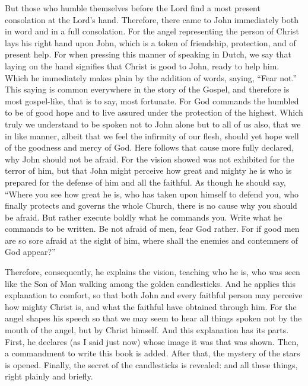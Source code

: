 But those who humble themselves before the Lord find a most present consolation at the Lord’s hand. Therefore, there came to John immediately both in word and in a full consolation. For the angel representing the person of Christ lays his right hand upon John, which is a token of friendship, protection, and of present help. For when pressing this manner of speaking in Dutch, we say that laying on the hand signifies that Christ is good to John, ready to help him. Which he immediately makes plain by the addition of words, saying, “Fear not.” This saying is common everywhere in the story of the Gospel, and therefore is most gospel-like, that is to say, most fortunate. For God commands the humbled to be of good hope and to live assured under the protection of the highest. Which truly we understand to be spoken not to John alone but to all of us also, that we in like manner, albeit that we feel the infirmity of our flesh, should yet hope well of the goodness and mercy of God. Here follows that cause more fully declared, why John should not be afraid. For the vision showed was not exhibited for the terror of him, but that John might perceive how great and mighty he is who is prepared for the defense of him and all the faithful. As though he should say, “Where you see how great he is, who has taken upon himself to defend you, who finally protects and governs the whole Church, there is no cause why you should be afraid. But rather execute boldly what he commands you. Write what he commands to be written. Be not afraid of men, fear God rather. For if good men are so sore afraid at the sight of him, where shall the enemies and contemners of God appear?”

Therefore, consequently, he explains the vision, teaching who he is, who was seen like the Son of Man walking among the golden candlesticks. And he applies this explanation to comfort, so that both John and every faithful person may perceive how mighty Christ is, and what the faithful have obtained through him. For the angel shapes his speech so that we may seem to hear all things spoken not by the mouth of the angel, but by Christ himself. And this explanation has its parts. First, he declares (as I said just now) whose image it was that was shown. Then, a commandment to write this book is added. After that, the mystery of the stars is opened. Finally, the secret of the candlesticks is revealed: and all these things, right plainly and briefly.

